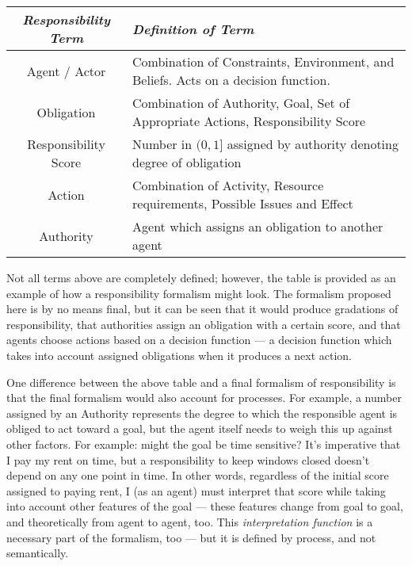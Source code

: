 \begin{tabular}{c p{10cm}}
    \emph{Responsibility Term} & \emph{Definition of Term} \\ \hline \hline
    Agent / Actor & Combination of Constraints, Environment, and Beliefs. Acts on a decision function. \\ \hline
    Obligation & Combination of Authority, Goal, Set of Appropriate Actions, Responsibility Score \\ \hline
    Responsibility Score & Number in \((0,1]\) assigned by authority denoting degree of obligation \\ \hline
    Action & Combination of Activity, Resource requirements, Possible Issues and Effect \\ \hline
    Authority & Agent which assigns an obligation to another agent \\ \hline
\end{tabular}

Not all terms above are completely defined; however, the table is provided as an example of how a responsibility formalism might look. The formalism proposed here is by no means final, but it can be seen that it would produce gradations of responsibility, that authorities assign an obligation with a certain score, and that agents choose actions based on a decision function --- a decision function which takes into account assigned obligations when it produces a next action.\par

One difference between the above table and a final formalism of responsibility is that the final formalism would also account for processes. For example, a number assigned by an Authority represents the degree to which the responsible agent is obliged to act toward a goal, but the agent itself needs to weigh this up against other factors. For example: might the goal be time sensitive? It's imperative that I pay my rent on time, but a responsibility to keep windows closed doesn't depend on any one point in time. In other words, regardless of the initial score assigned to paying rent, I (as an agent) must interpret that score while taking into account other features of the goal --- these features change from goal to goal, and theoretically from agent to agent, too. This \emph{interpretation function} is a necessary part of the formalism, too --- but it is defined by process, and not semantically.\par


